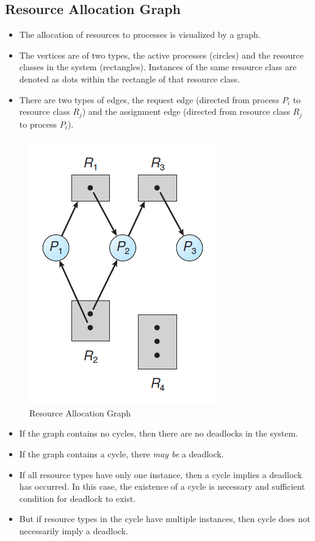 \documentclass{article}
\theoremstyle{plain}
\theoremstyle{definition}
\begin{document}
\subsection{Resource Allocation Graph}
\begin{itemize}
    \item The allocation of resources to processes is visualized by a graph.
    
    \item The vertices are of two types, the active processes (circles) and the resource classes in the system (rectangles). Instances of the same resource class are denoted as dots within the rectangle of that resource class. 
    
    \item There are two types of edges, the request edge (directed from process $P_i$ to resource class $R_j$) and the assignment edge (directed from resource class $R_j$ to process $P_i$).
\end{itemize}
\begin{figure}[h]
    \centering
    \includegraphics[scale = 0.7]{os2.png}
    \caption{Resource Allocation Graph}
    \label{fig:my_label_yy}
\end{figure}

\begin{itemize}
    \item If the graph contains no cycles, then there are no deadlocks in the system.
    
    \item If the graph contains a cycle, there \textit{may be} a deadlock.
    
    \item If all resource types have only one instance, then a cycle implies a deadlock has occurred. In this case, the existence of a cycle is necessary and sufficient condition for deadlock to exist.
    
    \item But if resource types in the cycle have multiple instances, then cycle does not necessarily imply a deadlock. 
\end{itemize}
\end{document}
